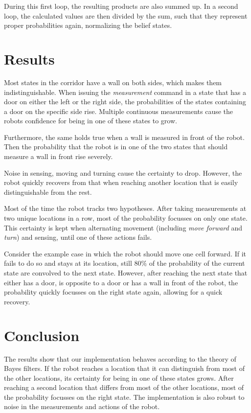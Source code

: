\documentclass[10pt,a4paper]{article}
\begin{document}
		During this first loop, the resulting products are also summed up. In a second loop, the calculated values are then divided by the sum, such that they represent proper probabilities again, normalizing the belief states.
	
	\section{Results}	
	Most states in the corridor have a wall on both sides, which makes them indistinguishable. When issuing the \textit{measurement} command in a state that has a door on either the left or the right side, the probabilities of the states containing a door on the specific side rise. Multiple continuous measurements cause the robots confidence for being in one of these states to grow.
	
	Furthermore, the same holds true when a wall is measured in front of the robot. Then the probability that the robot is in one of the two states that should measure a wall in front rise severely.
	
	Noise in sensing, moving and turning cause the certainty to drop. However, the robot quickly recovers from that when reaching another location that is easily distinguishable from the rest.
	
	Most of the time the robot tracks two hypotheses. After taking measurements at two unique locations in a row, most of the probability focusses on only one state. This certainty is kept when alternating movement (including \textit{move forward} and \textit{turn}) and sensing, until one of these actions fails.
	
	Consider the example case in which the robot should move one cell forward. If it fails to do so and stays at its location, still $80\%$ of the probability of the current state are convolved to the next state. However, after reaching the next state that either has a door, is opposite to a door or has a wall in front of the robot, the probability quickly focusses on the right state again, allowing for a quick recovery.
	
	\section{Conclusion}
	The results show that our implementation behaves according to the theory of Bayes filters. If the robot reaches a location that it can distinguish from most of the other locations, its certainty for being in one of these states grows. After reaching a second location that differs from most of the other locations, most of the probability focusses on the right state. The implementation is also robust to noise in the measurements and actions of the robot.
	
\end{document}
